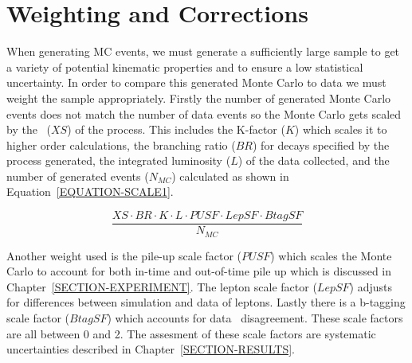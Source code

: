 \section{Weighting and Corrections}
\label{SECTION-MC-WEIGHTS}

When generating MC events, we must generate a sufficiently large sample to get a variety of potential kinematic properties and to ensure a low statistical uncertainty. In order to compare this generated Monte Carlo to data we must weight the sample appropriately. Firstly the number of generated Monte Carlo events does not match the number of data events so the Monte Carlo gets scaled by the \xs~($XS$) of the process. This includes the K-factor ($K$) which scales it to higher order calculations, the branching ratio ($BR$) for decays specified by the process generated, the integrated luminosity ($L$) of the data collected, and the number of generated events ($N_{MC}$) calculated as shown in Equation~\ref{EQUATION-SCALE1}. 

\begin{equation}
\frac{XS \cdot BR \cdot K \cdot L \cdot PUSF \cdot LepSF \cdot BtagSF}{N_{MC}}
\label{EQUATION-SCALE1}
\end{equation}

Another weight used is the pile-up scale factor ($PUSF$) which scales the Monte Carlo to account for both in-time and out-of-time pile up which is discussed in Chapter~\ref{SECTION-EXPERIMENT}. The lepton scale factor ($LepSF$) adjusts for differences between simulation and data of leptons. Lastly there is a b-tagging scale factor ($BtagSF$) which accounts for data \MC~disagreement. These scale factors are all between 0 and 2. The assesment of these scale factors are systematic uncertainties described in Chapter~\ref{SECTION-RESULTS}.




